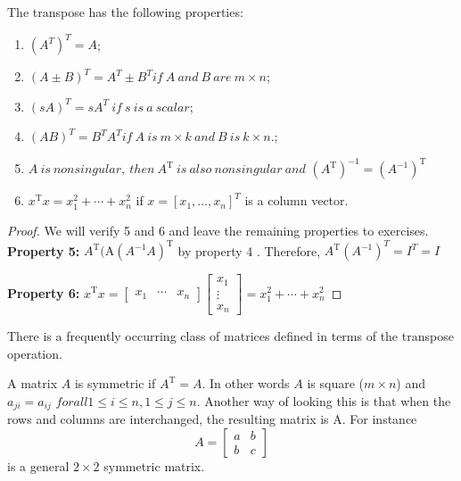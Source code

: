 \documentclass[../main.tex]{subfiles}
\begin{document}
\begin{theorem}
	\label{theo:theo_1_6}
	The transpose has the following properties:
\begin{enumerate}[label=\textbf{\arabic*. }, noitemsep]
	\item $(A^{T})^{T} = A$;
	\item$(A \pm B)^{T} = A^{T} \pm B^{T} if~A ~and ~B ~are ~m \times n$;
	\item $(sA)^{T} = sA^{T}~ if ~s ~is ~a ~scalar$;
	\item$(A B)^{T}  = B^{T} A^{T} if ~A ~is ~m \times k ~and ~B ~is ~k \times n$.;
	\item $A ~is ~nonsingular, ~then ~A^{\mathrm{T}} ~is ~also ~nonsingular ~and$ $\left(A^{\mathrm{T}}\right)^{-1}=\left(A^{-1}\right)^{\mathrm{T}}$
	\item $x^{\mathrm{T}} x=x_{1}^{2}+\cdots+x_{n}^{2}$ if $x=\left[x_{1}, \ldots, x_n \right]^T$ is a column vector.
\end{enumerate}
\end{theorem}

\begin{proof}
	We will verify 5 and 6 and leave the remaining properties to exercises.\\
	\textbf{Property 5:} $A^{\mathrm{T}}(\mathrm{A} \left(A^{-1} A\right)^{\mathrm{T}}$ by property 4 . Therefore, $A^{\mathrm{T}}\left(A^{-1}\right)^{T} = I^{T} = I$

	\textbf{Property 6:} $x^{\mathrm{T}} x=\left[\begin{array}{lll}x_{1} & \cdots & x_{n}\end{array}\right]\left[\begin{array}{c}x_{1} \\ \vdots \\ x_{n}\end{array}\right]=x_{1}^{2}+\cdots+x_{n}^{2}$
\end{proof}

There is a frequently  occurring class of matrices defined in terms of the transpose operation.

\begin{definition}
\label{defn:defn_1_14}A matrix $A$ is symmetric if $A^{\mathrm{T}}=A$. In other words $A$ is square ($m \times n $) and $ a_{ji} = a_{ij}$ $ for all 1 \leq i \leq n, 1 \leq j \leq n$. Another way of looking this is that when the rows and columns are interchanged, the resulting
matrix is A. For instance
$$A=\left[\begin{array}{ll}a & b \\ b & c\end{array}\right]$$
is a general $2 \times 2$ symmetric matrix.
\end{definition}
\end{document}
